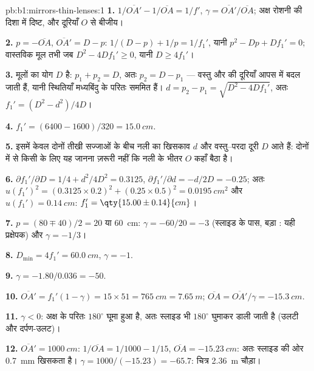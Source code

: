 \begin{solution}{pb:b1:mirrors-thin-lenses:1}
\textbf{1.} $1/\overline{OA'} - 1/\overline{OA} = 1/f'$,
$\gamma = \overline{OA'}/\overline{OA}$; अक्ष रोशनी की दिशा में दिष्ट, और
दूरियाँ $O$ से बीजीय।

\textbf{2.} $p = -\overline{OA}$, $\overline{OA'} = D - p$:
$1/(D - p) + 1/p = 1/f_1'$, यानी $p^2 - Dp + Df_1' = 0$; वास्तविक मूल तभी जब
$D^2 - 4Df_1' \geq 0$, यानी $D \geq 4f_1'$।

\textbf{3.} मूलों का योग $D$ है: $p_1 + p_2 = D$, अतः $p_2 = D - p_1$ ---
वस्तु और  की दूरियाँ आपस में बदल जाती हैं, यानी स्थितियाँ मध्यबिंदु के
परितः सममित हैं। $d = p_2 - p_1 = \sqrt{D^2 - 4Df_1'}$, अतः $f_1' = (D^2 -
d^2)/4D$।

\textbf{4.} $f_1' = (6400 - 1600)/320 = \qty{15.0}{cm}$.

\textbf{5.} इसमें केवल दोनों तीखी सज्जाओं के बीच नली का खिसकाव $d$ और
वस्तु--परदा दूरी $D$ आते हैं: दोनों में से किसी के लिए यह जानना ज़रूरी नहीं कि
नली के भीतर $O$ कहाँ बैठा है।

\textbf{6.} $\partial f_1'/\partial D = 1/4 + d^2/4D^2 = 0.3125$,
$\partial f_1'/\partial d = -d/2D = -0.25$; अतः
$u(f_1')^2 = (0.3125 \times 0.2)^2 + (0.25 \times 0.5)^2 =
\qty{0.0195}{cm^2}$ और $u(f_1') = \qty{0.14}{cm}$:
$f_1' = \qty{15.00\pm0.14}{cm}$।

\textbf{7.} $p = (80 \mp 40)/2 = 20$ या \qty{60}{cm}: $\gamma =
-60/20 = -3$ (स्लाइड  के पास, बड़ा : यही प्रक्षेपक) और
$\gamma = -1/3$।

\textbf{8.} $D_{\min} = 4f_1' = \qty{60.0}{cm}$, $\gamma = -1$.

\textbf{9.} $\gamma = -1.80/0.036 = -50$.

\textbf{10.} $\overline{OA'} = f_1'(1 - \gamma) = 15 \times 51 =
\qty{765}{cm} = \qty{7.65}{m}$; $\overline{OA} = \overline{OA'}/\gamma =
\qty{-15.3}{cm}$.

\textbf{11.} $\gamma < 0$:  अक्ष के परितः $180^\circ$
घूमा हुआ है, अतः स्लाइड भी $180^\circ$ घुमाकर डाली जाती है (उलटी
और दर्पण-उलट)।

\textbf{12.} $\overline{OA'} = \qty{1000}{cm}$: $1/\overline{OA} = 1/1000
- 1/15$, $\overline{OA} = \qty{-15.23}{cm}$: अतः  स्लाइड की ओर
\qty{0.7}{mm} खिसकता है। $\gamma = 1000/(-15.23) = -65.7$: चित्र
\qty{2.36}{m} चौड़ा।


\end{solution}
